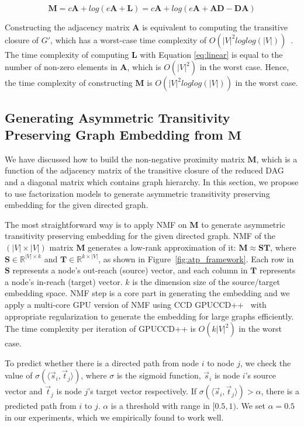 \documentclass[letterpaper]{article} \usepackage{aaai19}  \usepackage{times}  \usepackage{helvet}  \usepackage{courier}  \usepackage{url}  \usepackage{graphicx}  \usepackage{booktabs} \usepackage{xcolor}
\begin{document}
\begin{equation}
    \boldsymbol{M} =  c \boldsymbol{A} + log(e\boldsymbol{A} + \boldsymbol{L}) = c\boldsymbol{A} + log(e\boldsymbol{A} + \boldsymbol{AD} -\boldsymbol{DA})
\end{equation}

Constructing the adjacency matrix $\boldsymbol{A}$ is equivalent to computing the transitive closure of $G'$, which has a worst-case time complexity of $O(|V|^2loglog(|V|))$~\cite{SIMON1988325}.
The time complexity of computing  $\boldsymbol{L}$ with Equation \ref{eq:linear} is equal to the number of non-zero elements in $\boldsymbol{A}$, which is $O(|V|^2)$ in the worst case. Hence, the time complexity of constructing $\boldsymbol{M}$ is $O(|V|^2loglog(|V|))$ in the worst case. 

\subsection{Generating Asymmetric Transitivity Preserving Graph Embedding from $\boldsymbol{M}$}
\label{sec:mf}
We have discussed how to build the non-negative proximity matrix $\boldsymbol{M}$, which is a function of the adjacency matrix of the transitive closure of the reduced DAG and a diagonal matrix which contains graph hierarchy. In this section, we propose to use factorization models to generate asymmetric transitivity preserving embedding for the given directed graph. 



The most straightforward way is to apply NMF on $\boldsymbol{M}$ to generate asymmetric transitivity preserving embedding for the given directed graph.
NMF of the $(|V| \times |V|)$ matrix $\boldsymbol{M}$ generates a low-rank approximation of it: $\boldsymbol{M} \approx \boldsymbol{ST}$, where $\boldsymbol{S} \in \mathbb{R}^{|V| \times k}$ and $\boldsymbol{T} \in \mathbb{R}^{k \times |V|}$, as shown in Figure~\ref{fig:atp_framework}.
Each row in $\boldsymbol{S}$ represents a node's out-reach (source) vector, and each column in $\boldsymbol{T}$ represents a node's in-reach (target) vector. $k$ is the dimension size of the source/target embedding space. NMF step is a core part in generating the embedding and we apply a multi-core GPU version of NMF using CCD GPUCCD++~\cite{Nisa2017} with appropriate regularization to generate the embedding for large graphs efficiently. The time complexity per iteration of GPUCCD++ is $O(k|V|^2)$  in the worst case. 

To predict whether there is a directed path from node $i$ to node $j$, we check the value of $\sigma (\langle \vec{s}_i , \vec{t}_j \rangle)$, where $\sigma$ is the sigmoid function, $\vec{s}_i$ is node $i$'s source vector and $\vec{t}_j$ is node $j$'s target vector respectively. If $\sigma (\langle \vec{s}_i , \vec{t}_j \rangle) > \alpha$, there is a predicted path from $i$ to $j$. $\alpha$ is a threshold with range in $[0.5,1)$. We set $\alpha = 0.5$ in our experiments, which we empirically found to work well.
\end{document}
